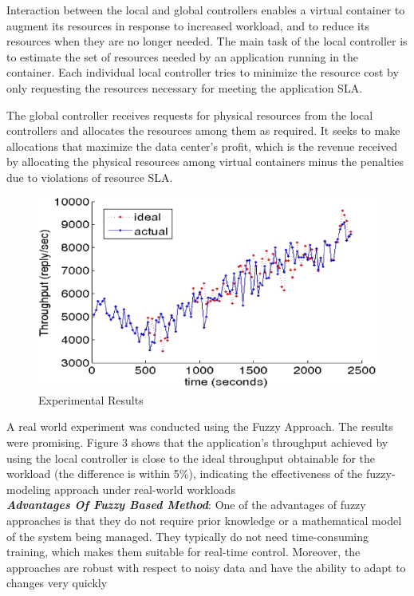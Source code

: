 \documentclass[conference]{IEEEtran}
\begin{document}
Interaction between the local and global controllers enables
a virtual container to augment its resources in response to
increased workload, and to reduce its resources when they
are no longer needed. The main task of the local controller
is to estimate the set of resources needed by an application
running in the container. Each individual local controller tries to minimize the resource
cost by only requesting the resources necessary for meeting the application SLA. 



The global controller receives requests for physical resources from the local controllers and allocates the resources among them as required. It seeks to make allocations that maximize the data center’s profit, which is the revenue received by allocating the physical resources
among virtual containers minus the penalties due to violations of resource SLA.

\begin{figure}[h!]
  \centering
   \includegraphics[scale=0.50]{fuzzy_experiment.png}
  \caption{Experimental Results}
\end{figure}
A real world experiment was conducted using the Fuzzy Approach. The results were promising. Figure 3 shows that the application’s throughput achieved by using the local controller is close to the ideal throughput obtainable for the
workload (the difference is within 5\%), indicating the effectiveness of the fuzzy-modeling approach under real-world
workloads\\
\textbf{\emph{Advantages Of Fuzzy Based Method}}:
One of the advantages of fuzzy approaches is that they do not require prior knowledge or a mathematical model of the system being managed. They typically do not need time-consuming training, which makes them suitable for real-time control. Moreover, the approaches are robust with respect to noisy data and have the ability to adapt to changes very quickly
\end{document}
